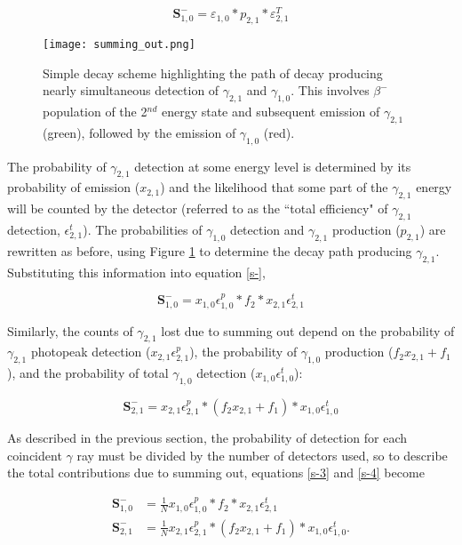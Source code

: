 \documentclass[12pt,twoside]{reedthesis}
\begin{document}
\begin{equation}
\textbf{S}_{1,0}^{-} = \varepsilon_{1,0} * p_{2,1} * \varepsilon^{T}_{2,1} 
\label{s-}
\end{equation}

 \begin{figure}[h!]
	\centering
	\texttt{[image: summing\_out.png]}
	\caption{Simple decay scheme highlighting the path of decay producing nearly simultaneous detection of $\gamma_{2,1}$ and $\gamma_{1,0}$. This involves $\beta^{-}$ population of the 2$^{nd}$ energy state and subsequent emission of $\gamma_{2,1}$ (green), followed by the emission of $\gamma_{1,0}$ (red).}
\label{sum_out}
\end{figure}

The probability of $\gamma_{2,1}$ detection at some energy level is determined by its probability of emission ($x_{2,1}$) and the likelihood that some part of the $\gamma_{2,1}$ energy will be counted by the detector (referred to as the ``total efficiency" of $\gamma_{2,1}$ detection, $\epsilon^{t}_{2,1}$). The probabilities of $\gamma_{1,0}$ detection and $\gamma_{2,1}$ production ($p_{2,1}$) are rewritten as before, using Figure \ref{sum_out} to determine the decay path producing $\gamma_{2,1}$. Substituting this information into equation \ref{s-},

\begin{equation}
\textbf{S}_{1,0}^{-} = x_{1,0} \epsilon^{p}_{1,0} * f_{2} * x_{2,1} \epsilon^{t}_{2,1} 
\label{s-3}
\end{equation}

Similarly, the counts of $\gamma_{2,1}$ lost due to summing out depend on the probability of $\gamma_{2,1}$ photopeak detection ($x_{2,1} \epsilon^{p}_{2,1}$), the probability of $\gamma_{1,0}$ production ($f_{2} x_{2,1} + f_{1}$), and the probability of total $\gamma_{1,0}$ detection ($x_{1,0} \epsilon^{t}_{1,0}$):

\begin{equation}
\textbf{S}_{2,1}^{-} = x_{2,1} \epsilon^{p}_{2,1} * (f_{2} x_{2,1} + f_{1}) * x_{1,0} \epsilon^{t}_{1,0} 
\label{s-4}
\end{equation}

As described in the previous section, the probability of detection for each coincident $\gamma$ ray must be divided by the number of detectors used, so to describe the total contributions due to summing out, equations \ref{s-3} and \ref{s-4} become

\begin{align}
\textbf{S}_{1,0}^{-} &= \frac{1}{N} x_{1,0} \epsilon^{p}_{1,0} * f_{2} * x_{2,1} \epsilon^{t}_{2,1} \\
\textbf{S}_{2,1}^{-} &= \frac{1}{N} x_{2,1} \epsilon^{p}_{2,1} * (f_{2} x_{2,1} + f_{1}) * x_{1,0} \epsilon^{t}_{1,0}. 
\label{sumout}
\end{align}
\end{document}
